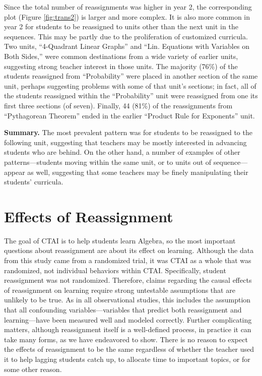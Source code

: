 \documentclass[12pt]{article}\usepackage[]{graphicx}\usepackage[]{color}
\begin{document}
Since the total number of reassignments was higher in year 2, the corresponding plot (Figure \ref{fig:trans2}) is larger and more complex.
It is also more common in year 2 for students to be reassigned to units other than the next unit in the sequences.
This may be partly due to the proliferation of customized curricula.
Two units, ``4-Quadrant Linear Graphs'' and ``Lin. Equations with
Variables on Both Sides,'' were common destinations from a wide
variety of earlier units, suggesting strong teacher interest in those units.
The majority (76\%)
of the students reassigned from ``Probability'' were placed in another section of the same unit, perhaps suggesting problems with some of that unit's sections; in fact, all of the students reassigned within the ``Probability'' unit were reassigned from one its first three sections (of seven).
Finally, 44
(81\%) of the reassignments from ``Pythagorean Theorem'' ended in the earlier ``Product Rule for Exponents'' unit.

\textbf{Summary.} The most prevalent pattern was for students to be reassigned
to the following unit, suggesting that teachers may be mostly
interested in advancing students who are behind.
On the other hand, a number of examples of other patterns---students moving within the same unit, or to units out of sequence---appear as well, suggesting that some teachers may be finely manipulating their students' curricula.



\section{Effects of Reassignment}\label{sec:effects}
The goal of CTAI is to help students learn Algebra, so
the most important questions about reassignment are about its effect on learning.
Although the data from this study came from a randomized trial, it was
CTAI as a whole that was randomized, not individual behaviors within CTAI.
Specifically, student reassignment was not randomized.
Therefore, claims regarding the causal effects of reassignment on
learning require strong untestable assumptions that are unlikely to be
true.
As in all observational studies, this includes the assumption that all
confounding variables---variables that predict both reassignment and
learning---have been measured well and modeled correctly.
Further complicating matters, although reassignment itself is a
well-defined process, in practice it can take many forms, as we have
endeavored to show.
There is no reason to expect the effects of reassignment to be
the same regardless of whether the teacher used it to help lagging
students catch up, to allocate time to important topics, or for some
other reason.
\end{document}
